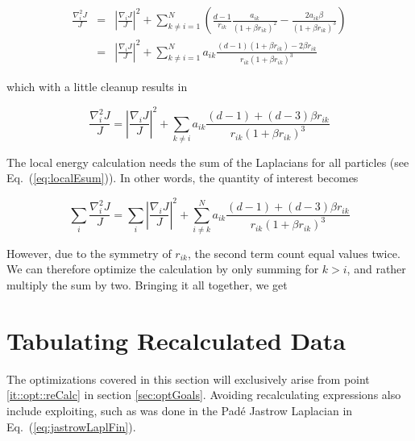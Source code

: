 \begin{eqnarray}
 \frac{\nabla^2_i J}{J} &=& \left| \frac{\nabla_i J}{J}\right|^2 + \sum_{k \ne i = 1}^N \left(\frac{d-1}{r_{ik}}\frac{a_{ik}}{(1 + \beta r_{ik})^2} - \frac{2a_{ik}\beta}{(1 + \beta r_{ik})^3}\right) \nonumber\\
  &=& \left| \frac{\nabla_i J}{J}\right|^2 + \sum_{k \ne i = 1}^N a_{ik}\frac{(d-1)(1 + \beta r_{ik}) - 2\beta r_{ik}}{r_{ik}(1 + \beta r_{ik})^3} \nonumber
\end{eqnarray}

which with a little cleanup results in

\begin{equation}
 \frac{\nabla^2_i J}{J} = \left| \frac{\nabla_i J}{J}\right|^2 + \sum_{k \ne i} a_{ik}\frac{(d-1) + (d-3)\beta r_{ik}}{r_{ik}(1 + \beta r_{ik})^3}
\end{equation}

The local energy calculation needs the sum of the Laplacians for all particles (see Eq.~(\ref{eq:localEsum})). In other words, the quantity of interest becomes

\begin{equation}
 \sum_i \frac{\nabla^2_i J}{J} = \sum_i \left|\frac{\nabla_i J}{J}\right|^2 + \sum_{i \ne k}^N a_{ik}\frac{(d-1) + (d-3)\beta r_{ik}}{r_{ik}(1 + \beta r_{ik})^3}
\end{equation}

However, due to the symmetry of $r_{ik}$, the second term count equal values twice. We can therefore optimize the calculation by only summing for $k>i$, and rather multiply the sum by two. Bringing it all together, we get



\section{Tabulating Recalculated Data}

The optimizations covered in this section will exclusively arise from point \ref{it::opt::reCalc} in section \ref{sec:optGoals}. Avoiding recalculating expressions also include exploiting, such as was done in the Padé Jastrow Laplacian in Eq.~(\ref{eq:jastrowLaplFin}).


